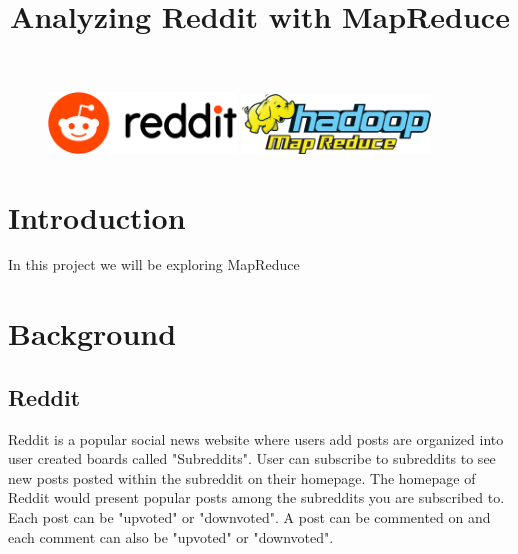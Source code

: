 \documentclass{article}
\title{Analyzing Reddit with MapReduce\\ } %
\date{\vspace{-7ex}}
\begin{document}
\maketitle %

\begin{figure}[h!]
 \centering
 \includegraphics[width=50mm]{images/reddit}\hspace{15mm}
 \includegraphics[width=50mm]{images/mapreduce}
\end{figure} 


\section*{Introduction} %

In this project we will be exploring MapReduce 


\section*{Background}

\subsection*{Reddit}
Reddit is a popular social news website where users add posts are organized into user created boards called "Subreddits". User can subscribe to subreddits to see new posts posted within the subreddit on their homepage. The homepage of Reddit would present popular posts among the subreddits you are subscribed to. Each post can be "upvoted" or "downvoted". A post can be commented on and each comment can also be "upvoted" or "downvoted".  
\end{document}
